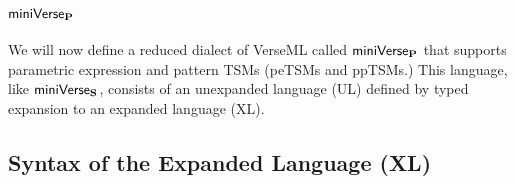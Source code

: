 



\section{\texorpdfstring{$\mathsf{miniVerse}_\textbf{P}$}{miniVerseP}}\label{sec:miniVerseP}
We will now define a reduced dialect of VerseML called $\mathsf{miniVerse}_\textbf{P}$ that supports parametric expression and pattern TSMs (peTSMs and ppTSMs.) This language, like $\mathsf{miniVerse}_\textbf{S}$, consists of an unexpanded language (UL) defined by typed expansion to an expanded language (XL).

\subsection{Syntax of the Expanded Language (XL)}\label{sec:P-expanded-terms}


